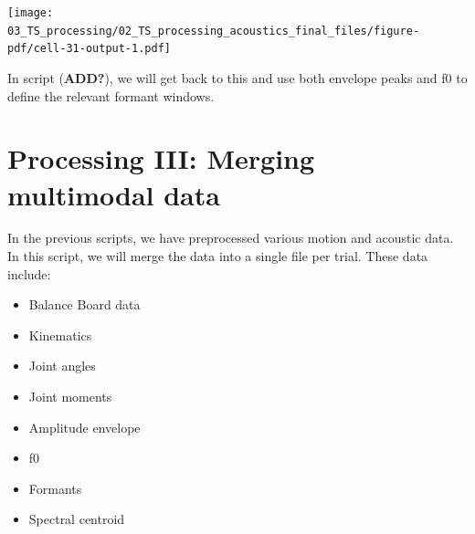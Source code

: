 \documentclass[
  letterpaper,
  DIV=11,
  numbers=noendperiod]{scrreprt}
\providecommand{\tightlist}{%
  \setlength{\itemsep}{0pt}\setlength{\parskip}{0pt}}\usepackage{longtable,booktabs,array}
\begin{document}
\texttt{[image: 03\_TS\_processing/02\_TS\_processing\_acoustics\_final\_files/figure-pdf/cell-31-output-1.pdf]}

In script (\textbf{ADD?}), we will get back to this and use both
envelope peaks and f0 to define the relevant formant windows.


\chapter{Processing III: Merging multimodal
data}\label{processing-iii-merging-multimodal-data}

In the previous scripts, we have preprocessed various motion and
acoustic data. In this script, we will merge the data into a single file
per trial. These data include:

\begin{itemize}
\tightlist
\item
  Balance Board data
\item
  Kinematics
\item
  Joint angles
\item
  Joint moments
\item
  Amplitude envelope
\item
  f0
\item
  Formants
\item
  Spectral centroid
\end{itemize}
\end{document}
